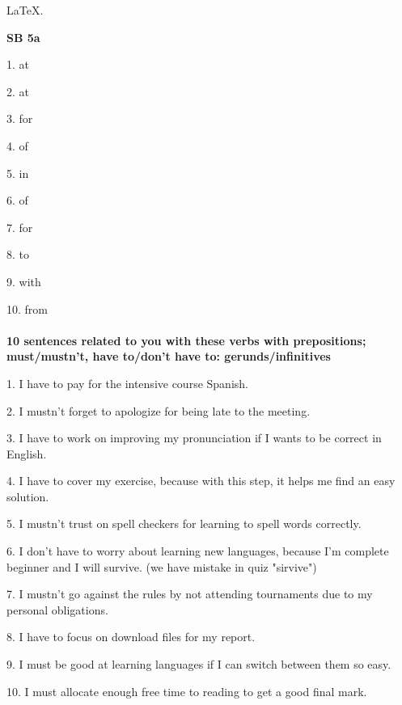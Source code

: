 \documentclass{article}
\begin{document}
\begin{center}
    \LARGE
    \color{pink}
    \LaTeX \color{lime}.
\end{center}
\textbf{SB 5a}

1. at

2. at

3. for

4. of

5. in

6. of

7. for

8. to

9. with

10. from
\\ \\
\textbf{10 sentences related to you with these verbs with prepositions; must/mustn't, have to/don't have to: gerunds/infinitives}

1. I have to pay for the intensive course Spanish.

2. I mustn't forget to apologize for being late to the meeting.

3. I have to work on improving my pronunciation if I wants to be correct in English.

4. I have to cover my exercise, because with this step, it helps me find an easy solution.

5. I mustn't trust on spell checkers for learning to spell words correctly. 

6. I don't have to worry about learning new languages, because I’m complete beginner and I will survive. (we have mistake in quiz "sirvive")

7. I mustn't go against the rules by not attending tournaments due to my personal obligations.

8. I have to focus on download files for my report.

9. I must be good at learning languages if I can switch between them so easy.

10. I must allocate enough free time to reading to get a good final mark.
\end{document}

